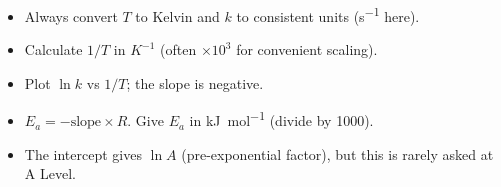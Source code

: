 \documentclass[11pt]{article}
\begin{document}
\begin{exoresolu}
\begin{aretenir}
\begin{itemize}
    \item Always convert $T$ to Kelvin and $k$ to consistent units (\si{s^{-1}} here).
    \item Calculate $1/T$ in $\si{K^{-1}}$ (often $\times 10^3$ for convenient scaling).
    \item Plot $\ln k$ vs $1/T$; the slope is negative.
    \item $E_a = -\text{slope} \times R$. Give $E_a$ in \si{kJ.mol^{-1}} (divide by 1000).
    \item The intercept gives $\ln A$ (pre-exponential factor), but this is rarely asked at A Level.
\end{itemize}
\end{aretenir}
\end{exoresolu}
\end{document}
